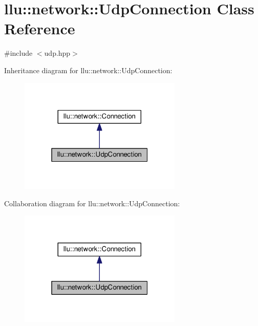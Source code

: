\hypertarget{classllu_1_1network_1_1_udp_connection}{\section{llu\+:\+:network\+:\+:Udp\+Connection Class Reference}
\label{classllu_1_1network_1_1_udp_connection}
}


{\ttfamily \#include $<$udp.\+hpp$>$}



Inheritance diagram for llu\+:\+:network\+:\+:Udp\+Connection\+:
\nopagebreak
\begin{figure}[H]
\begin{center}
\leavevmode
\includegraphics[width=220pt]{classllu_1_1network_1_1_udp_connection__inherit__graph}
\end{center}
\end{figure}


Collaboration diagram for llu\+:\+:network\+:\+:Udp\+Connection\+:
\nopagebreak
\begin{figure}[H]
\begin{center}
\leavevmode
\includegraphics[width=220pt]{classllu_1_1network_1_1_udp_connection__coll__graph}
\end{center}
\end{figure}
